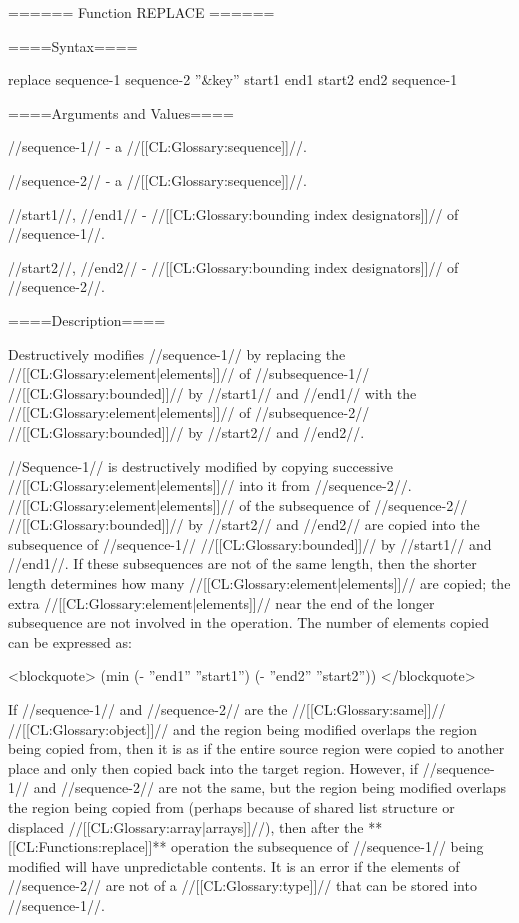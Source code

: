 ====== Function REPLACE ======

====Syntax====

\DefunWithValues replace {sequence-1 sequence-2 ''&key'' start1 end1 start2 end2} {sequence-1}

====Arguments and Values====

//sequence-1// - a //[[CL:Glossary:sequence]]//.

//sequence-2// - a //[[CL:Glossary:sequence]]//.

//start1//, //end1// - //[[CL:Glossary:bounding index designators]]// of //sequence-1//. 

//start2//, //end2// - //[[CL:Glossary:bounding index designators]]// of //sequence-2//. 

====Description====

Destructively modifies //sequence-1// by replacing the //[[CL:Glossary:element|elements]]// of //subsequence-1// //[[CL:Glossary:bounded]]// by //start1// and //end1// with the //[[CL:Glossary:element|elements]]// of //subsequence-2// //[[CL:Glossary:bounded]]// by //start2// and //end2//.

//Sequence-1// is destructively modified by copying successive //[[CL:Glossary:element|elements]]// into it from //sequence-2//. //[[CL:Glossary:element|elements]]// of the subsequence of //sequence-2// //[[CL:Glossary:bounded]]// by //start2// and //end2// are copied into the subsequence of //sequence-1// //[[CL:Glossary:bounded]]// by //start1// and //end1//. If these subsequences are not of the same length, then the shorter length determines how many //[[CL:Glossary:element|elements]]// are copied; the extra //[[CL:Glossary:element|elements]]// near the end of the longer subsequence are not involved in the operation. The number of elements copied can be expressed as:

<blockquote> (min (- ''end1'' ''start1'') (- ''end2'' ''start2'')) </blockquote>

If //sequence-1// and //sequence-2// are the //[[CL:Glossary:same]]// //[[CL:Glossary:object]]// and the region being modified overlaps the region being copied from, then it is as if the entire source region were copied to another place and only then copied back into the target region. However, if //sequence-1// and //sequence-2// are not the same, but the region being modified overlaps the region being copied from (perhaps because of shared list structure or displaced //[[CL:Glossary:array|arrays]]//), then after the **[[CL:Functions:replace]]** operation the subsequence of //sequence-1// being modified will have unpredictable contents. It is an error if the elements of //sequence-2// are not of a //[[CL:Glossary:type]]// that can be stored into //sequence-1//.

